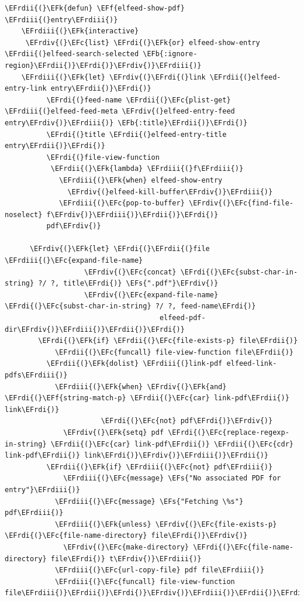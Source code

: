 \documentclass{scrartcl}
\newcommand{\EFk}[1]{\textcolor{EFk}{#1}} %
\newcommand{\EFs}[1]{\textcolor{EFs}{#1}} %
\newcommand{\EFb}[1]{\textcolor{EFb}{#1}} %
\newcommand{\EFc}[1]{\textcolor{EFc}{#1}} %
\newcommand{\EFf}[1]{\textcolor{EFf}{#1}} %
\newcommand{\EFrdi}[1]{#1} %
\newcommand{\EFrdii}[1]{#1} %
\newcommand{\EFrdiii}[1]{#1} %
\newcommand{\EFrdiv}[1]{#1} %
\begin{document}
\begin{Code}
\begin{Verbatim}[]
  \EFrdii{(}\EFk{defun} \EFf{elfeed-show-pdf} \EFrdiii{(}entry\EFrdiii{)}
    \EFrdiii{(}\EFk{interactive}
     \EFrdiv{(}\EFc{list} \EFrdi{(}\EFk{or} elfeed-show-entry \EFrdii{(}elfeed-search-selected \EFb{:ignore-region}\EFrdii{)}\EFrdi{)}\EFrdiv{)}\EFrdiii{)}
    \EFrdiii{(}\EFk{let} \EFrdiv{(}\EFrdi{(}link \EFrdii{(}elfeed-entry-link entry\EFrdii{)}\EFrdi{)}
          \EFrdi{(}feed-name \EFrdii{(}\EFc{plist-get} \EFrdiii{(}elfeed-feed-meta \EFrdiv{(}elfeed-entry-feed entry\EFrdiv{)}\EFrdiii{)} \EFb{:title}\EFrdii{)}\EFrdi{)}
          \EFrdi{(}title \EFrdii{(}elfeed-entry-title entry\EFrdii{)}\EFrdi{)}
          \EFrdi{(}file-view-function
           \EFrdii{(}\EFk{lambda} \EFrdiii{(}f\EFrdiii{)}
             \EFrdiii{(}\EFk{when} elfeed-show-entry
               \EFrdiv{(}elfeed-kill-buffer\EFrdiv{)}\EFrdiii{)}
             \EFrdiii{(}\EFc{pop-to-buffer} \EFrdiv{(}\EFc{find-file-noselect} f\EFrdiv{)}\EFrdiii{)}\EFrdii{)}\EFrdi{)}
          pdf\EFrdiv{)}

      \EFrdiv{(}\EFk{let} \EFrdi{(}\EFrdii{(}file \EFrdiii{(}\EFc{expand-file-name}
                   \EFrdiv{(}\EFc{concat} \EFrdi{(}\EFc{subst-char-in-string} ?/ ?, title\EFrdi{)} \EFs{".pdf"}\EFrdiv{)}
                   \EFrdiv{(}\EFc{expand-file-name} \EFrdi{(}\EFc{subst-char-in-string} ?/ ?, feed-name\EFrdi{)}
                                     elfeed-pdf-dir\EFrdiv{)}\EFrdiii{)}\EFrdii{)}\EFrdi{)}
        \EFrdi{(}\EFk{if} \EFrdii{(}\EFc{file-exists-p} file\EFrdii{)}
            \EFrdii{(}\EFc{funcall} file-view-function file\EFrdii{)}
          \EFrdii{(}\EFk{dolist} \EFrdiii{(}link-pdf elfeed-link-pdfs\EFrdiii{)}
            \EFrdiii{(}\EFk{when} \EFrdiv{(}\EFk{and} \EFrdi{(}\EFf{string-match-p} \EFrdii{(}\EFc{car} link-pdf\EFrdii{)} link\EFrdi{)}
                       \EFrdi{(}\EFc{not} pdf\EFrdi{)}\EFrdiv{)}
              \EFrdiv{(}\EFk{setq} pdf \EFrdi{(}\EFc{replace-regexp-in-string} \EFrdii{(}\EFc{car} link-pdf\EFrdii{)} \EFrdii{(}\EFc{cdr} link-pdf\EFrdii{)} link\EFrdi{)}\EFrdiv{)}\EFrdiii{)}\EFrdii{)}
          \EFrdii{(}\EFk{if} \EFrdiii{(}\EFc{not} pdf\EFrdiii{)}
              \EFrdiii{(}\EFc{message} \EFs{"No associated PDF for entry"}\EFrdiii{)}
            \EFrdiii{(}\EFc{message} \EFs{"Fetching \%s"} pdf\EFrdiii{)}
            \EFrdiii{(}\EFk{unless} \EFrdiv{(}\EFc{file-exists-p} \EFrdi{(}\EFc{file-name-directory} file\EFrdi{)}\EFrdiv{)}
              \EFrdiv{(}\EFc{make-directory} \EFrdi{(}\EFc{file-name-directory} file\EFrdi{)} t\EFrdiv{)}\EFrdiii{)}
            \EFrdiii{(}\EFc{url-copy-file} pdf file\EFrdiii{)}
            \EFrdiii{(}\EFc{funcall} file-view-function file\EFrdiii{)}\EFrdii{)}\EFrdi{)}\EFrdiv{)}\EFrdiii{)}\EFrdii{)}\EFrdi{)}
\end{Verbatim}
\end{Code}
\end{document}
